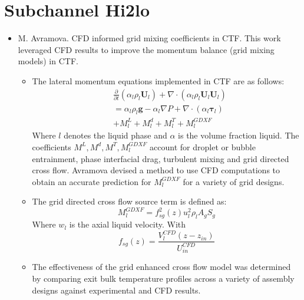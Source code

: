 \section{Subchannel Hi2lo}

\begin{itemize}
    \item  M. Avramova.  CFD informed grid mixing coefficients in CTF.  This work leveraged CFD results to improve the momentum balance (grid mixing models) in CTF. \cite{avramova2007}
    
    \begin{itemize}
    	
    	\item The lateral momentum equations implemented in CTF are as follows:
    	\begin{align}
    	& \frac{\partial }{\partial t}(\alpha_l \rho_l \mathbf U_l)
    	+ \nabla \cdot (\alpha_l \rho_l \mathbf U_l \mathbf U_l) \nonumber \\
    	&= \alpha_l \rho_l \mathbf{g} - \alpha_l \nabla P + 
    	\nabla \cdot (\alpha_l \bm{\tau}_l) \nonumber \\
    	&+ M^L_l + M^d_l + M^T_l + M_l^{GDXF}
    	\end{align}
    	Where $l$ denotes the liquid phase and $\alpha$ is the volume fraction liquid.  The coefficients $M^L, M^d, M^T, M_l^{GDXF}$ account for droplet or bubble entrainment, phase interfacial drag, turbulent mixing and grid directed cross flow.  Avramova devised a method to use CFD computations to obtain an accurate prediction for $M_l^{GDXF}$ for a variety of grid designs.
    	
    	\item The grid directed cross flow source term is defined as:
    	\begin{equation}
    	M_l^{GDXF} = f^2_{sg}(z) u_l^2 \rho_l A_g S_g
    	\end{equation}
    	Where $w_l$ is the axial liquid velocity.
    	With
    	\begin{equation}
    	f_{sg}(z) = \frac{V^{CFD}_l(z-z_{in})}{U^{CFD}_{in}}
    	\end{equation}
    	
    	\item The effectiveness of the grid enhanced cross flow model was determined by comparing exit bulk temperature profiles across a variety of assembly designs against experimental and CFD results.
    	
    \end{itemize}
    

\end{itemize}
